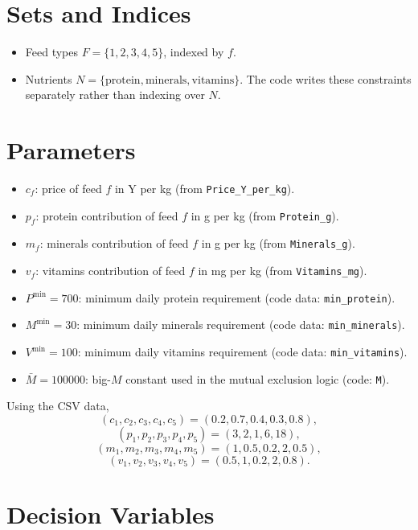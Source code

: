 \section*{Sets and Indices}

\begin{itemize}
    \item Feed types \(F = \{1,2,3,4,5\}\), indexed by \(f\).
    \item Nutrients \(N = \{\text{protein}, \text{minerals}, \text{vitamins}\}\). The code writes these constraints separately rather than indexing over \(N\).
\end{itemize}

\section*{Parameters}

\begin{itemize}
    \item \(c_f\): price of feed \(f\) in Y per kg (from \texttt{Price\_Y\_per\_kg}).
    \item \(p_f\): protein contribution of feed \(f\) in g per kg (from \texttt{Protein\_g}).
    \item \(m_f\): minerals contribution of feed \(f\) in g per kg (from \texttt{Minerals\_g}).
    \item \(v_f\): vitamins contribution of feed \(f\) in mg per kg (from \texttt{Vitamins\_mg}).
    \item \(P^{\min}=700\): minimum daily protein requirement (code data: \texttt{min\_protein}).
    \item \(M^{\min}=30\): minimum daily minerals requirement (code data: \texttt{min\_minerals}).
    \item \(V^{\min}=100\): minimum daily vitamins requirement (code data: \texttt{min\_vitamins}).
    \item \(\bar M = 100000\): big-\(M\) constant used in the mutual exclusion logic (code: \texttt{M}).
\end{itemize}

Using the CSV data,
\[
(c_1,c_2,c_3,c_4,c_5)=(0.2,0.7,0.4,0.3,0.8),
\]
\[
(p_1,p_2,p_3,p_4,p_5)=(3,2,1,6,18),
\]
\[
(m_1,m_2,m_3,m_4,m_5)=(1,0.5,0.2,2,0.5),
\]
\[
(v_1,v_2,v_3,v_4,v_5)=(0.5,1,0.2,2,0.8).
\]

\section*{Decision Variables}

